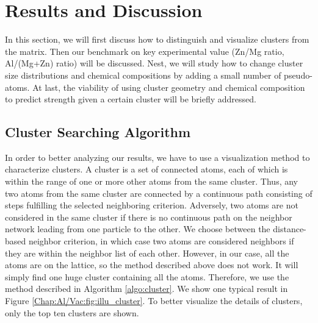 \section{Results and Discussion}
\label{Chap:Al/Vac:section:RD}

In this section, we will first discuss how to distinguish and visualize clusters from the matrix. Then our benchmark on key experimental value (Zn/Mg ratio, Al/(Mg+Zn) ratio) will be discussed. Nest, we will study how to change cluster size distributions and chemical compositions by adding a small number of pseudo-atoms. At last, the viability of using cluster geometry and chemical composition to predict strength given a certain cluster will be briefly addressed.


\subsection{Cluster Searching Algorithm}

In order to better analyzing our results, we have to use a visualization method to characterize clusters. A cluster is a set of connected atoms, each of which is within the range of one or more other atoms from the same cluster. Thus, any two atoms from the same cluster are connected by a continuous path consisting of steps fulfilling the selected neighboring criterion. Adversely, two atoms are not considered in the same cluster if there is no continuous path on the neighbor network leading from one particle to the other. We choose between the distance-based neighbor criterion, in which case two atoms are considered neighbors if they are within the neighbor list of each other. However, in our case, all the atoms are on the lattice, so the method described above does not work. It will simply find one huge cluster containing all the atoms. Therefore, we use the method described in Algorithm \ref{algo:cluster}. We show one typical result in Figure \ref{Chap:Al/Vac:fig:illu_cluster}. To better visualize the details of clusters,  only the top ten clusters are shown. 


